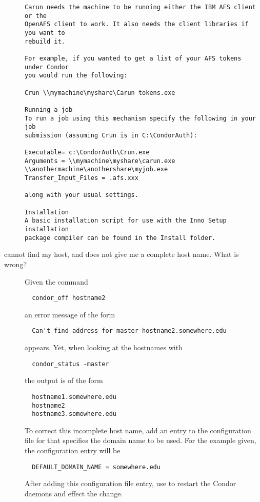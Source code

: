 \begin{description}
\begin{verbatim}
Carun needs the machine to be running either the IBM AFS client or the 
OpenAFS client to work. It also needs the client libraries if you want to 
rebuild it.

For example, if you wanted to get a list of your AFS tokens under Condor 
you would run the following:

Crun \\mymachine\myshare\Carun tokens.exe

Running a job
To run a job using this mechanism specify the following in your job 
submission (assuming Crun is in C:\CondorAuth):

Executable= c:\CondorAuth\Crun.exe
Arguments = \\mymachine\myshare\carun.exe 
\\anothermachine\anothershare\myjob.exe
Transfer_Input_Files = .afs.xxx

along with your usual settings.

Installation
A basic installation script for use with the Inno Setup installation 
package compiler can be found in the Install folder.
\end{verbatim}

\item[\Condor{off} cannot find my host, and \Condor{status} does not give me a complete host name.  What is wrong?]

Given the command
\begin{verbatim}
  condor_off hostname2
\end{verbatim}
an error message of the form
\begin{verbatim}
  Can't find address for master hostname2.somewhere.edu
\end{verbatim}
appears.
Yet, when looking at the hostnames with
\begin{verbatim}
  condor_status -master
\end{verbatim}
the output is of the form 
\begin{verbatim}
  hostname1.somewhere.edu
  hostname2
  hostname3.somewhere.edu
\end{verbatim}

To correct this incomplete host name, add an entry to the
configuration file for
that specifies the domain name to be used.
For the example given, the configuration entry will be
\begin{verbatim}
  DEFAULT_DOMAIN_NAME = somewhere.edu
\end{verbatim}

After adding this configuration file entry, use 
to restart the Condor daemons and effect the change.

%
\end{description}

